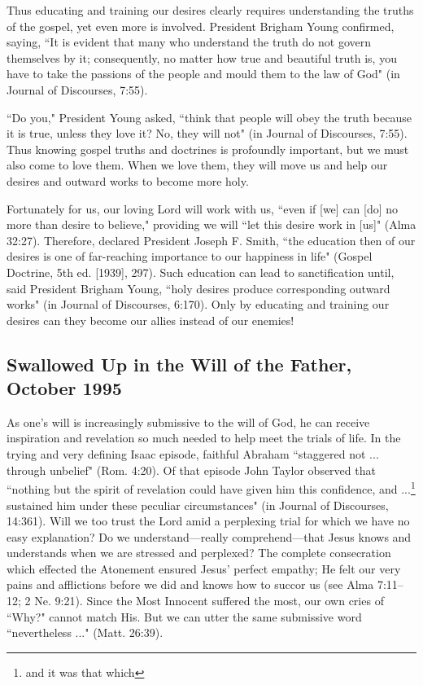 Thus educating and training our desires clearly requires understanding the truths of the gospel, yet even more is involved. President Brigham Young confirmed, saying, ``It is evident that many who understand the truth do not govern themselves by it; consequently, no matter how true and beautiful truth is, you have to take the passions of the people and mould them to the law of God" (in Journal of Discourses, 7:55).

``Do you," President Young asked, ``think that people will obey the truth because it is true, unless they love it? No, they will not" (in Journal of Discourses, 7:55). Thus knowing gospel truths and doctrines is profoundly important, but we must also come to love them. When we love them, they will move us and help our desires and outward works to become more holy.

Fortunately for us, our loving Lord will work with us, ``even if [we] can [do] no more than desire to believe," providing we will ``let this desire work in [us]" (Alma 32:27). Therefore, declared President Joseph F. Smith, ``the education then of our desires is one of far-reaching importance to our happiness in life" (Gospel Doctrine, 5th ed. [1939], 297). Such education can lead to sanctification until, said President Brigham Young, ``holy desires produce corresponding outward works" (in Journal of Discourses, 6:170). Only by educating and training our desires can they become our allies instead of our enemies!

\subsection{Swallowed Up in the Will of the Father, October 1995}

As one's will is increasingly submissive to the will of God, he can receive inspiration and revelation so much needed to help meet the trials of life. In the trying and very defining Isaac episode, faithful Abraham ``staggered not ... through unbelief" (Rom. 4:20). Of that episode John Taylor observed that ``nothing but the spirit of revelation could have given him this confidence, and ...\footnote{and it was that which} sustained him under these peculiar circumstances" (in Journal of Discourses, 14:361). Will we too trust the Lord amid a perplexing trial for which we have no easy explanation? Do we understand—really comprehend—that Jesus knows and understands when we are stressed and perplexed? The complete consecration which effected the Atonement ensured Jesus' perfect empathy; He felt our very pains and afflictions before we did and knows how to succor us (see Alma 7:11–12; 2 Ne. 9:21). Since the Most Innocent suffered the most, our own cries of ``Why?" cannot match His. But we can utter the same submissive word ``nevertheless ..." (Matt. 26:39).

